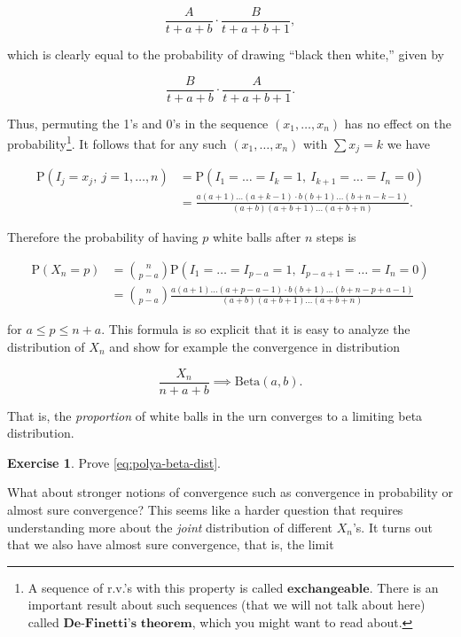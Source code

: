 \documentclass[11pt]{report}
\theoremstyle{plain}
\theoremstyle{definition}
\newtheorem{xexercise}[thm]{Exercise}
\begin{document}
\[
\frac{A}{t+a+b}\cdot \frac{B}{t+a+b+1},
\]

\noindent which is clearly equal to the probability of drawing
``black then white,'' given by

\[
\frac{B}{t+a+b}\cdot \frac{A}{t+a+b+1}.
\]

\noindent Thus, permuting the 1's and 0's in the sequence
$(x_1,\ldots,x_n)$ has no effect on the
probability\footnote{A sequence of r.v.'s with this property is called
$\textbf{exchangeable}$. There is an important result
about such sequences (that we will not talk about
here) called $\textbf{De-Finetti's theorem}$, which
you might want to read about.}. It follows that for
any such $(x_1,\ldots,x_n)$ with $\sum x_j=k$ we have

\begin{align*}
\mathrm{P}(I_j = x_j,\ j=1,\ldots,n) &= \mathrm{P}(I_1=\ldots=I_k=1,\ I_{k+1}=\ldots=I_n=0) \\
&=
\tag{2}\label{eq:polyaurn-formula}
\frac{a(a+1)\ldots(a+k-1)\cdot b(b+1)\ldots(b+n-k-1)}{(a+b)(a+b+1)\ldots(a+b+n)}.
\end{align*}

\noindent Therefore the probability of having $p$ white balls
after $n$ steps is

\begin{align*}
\mathrm{P}(X_n = p) &= \binom{n}{p-a}
\mathrm{P}(I_1=\ldots=I_{p-a}=1,\ I_{p-a+1}=\ldots=I_n=0) \\
&=
\binom{n}{p-a}
\frac{a(a+1)\ldots(a+p-a-1)\cdot b(b+1)\ldots(b+n-p+a-1)}{(a+b)(a+b+1)\ldots(a+b+n)}
\end{align*}

\noindent for $a \le p \le n+a$. This formula is so explicit
that it is easy to analyze the distribution of $X_n$
and show for example the convergence in distribution

\begin{equation*} \tag{3}\label{eq:polya-beta-dist}
\frac{X_n}{n+a+b} \implies \textrm{Beta}(a,b).
\end{equation*}

\noindent That is, the \emph{proportion} of white balls in the urn
converges to a limiting beta distribution.

\begin{xexercise}
Prove \eqref{eq:polya-beta-dist}.
\end{xexercise}

\noindent What about stronger notions of convergence such as
convergence in probability or almost sure convergence?
This seems like a harder question that requires
understanding more about the \emph{joint} distribution of
different $X_n$'s. It turns out that we also have
almost sure convergence, that is, the limit
\end{document}
